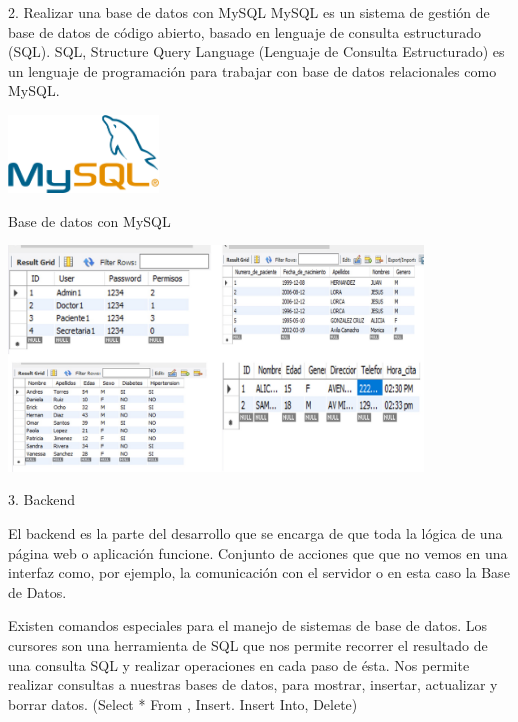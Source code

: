 \documentclass[10pt]{beamer}
\begin{document}
\begin{frame}{2. Realizar una base de datos con MySQL}
MySQL es un sistema de gestión de base de datos de código abierto, basado en lenguaje de consulta estructurado (SQL).
SQL, Structure Query Language (Lenguaje de Consulta Estructurado) es un lenguaje de programación para trabajar con base de datos relacionales como MySQL.

\centering
\includegraphics[width=4cm]{mysql.png}

\end{frame}
\begin{frame}{Base de datos con MySQL}

\centering
\includegraphics[width=11cm,]{junto.jpg}




\end{frame}



\begin{frame}{3. Backend}

El backend es la parte del desarrollo  que se encarga de que toda la lógica de una página web o aplicación  funcione. Conjunto de acciones que que no vemos en una interfaz como, por ejemplo, la comunicación con el servidor o en esta caso la Base de Datos.


Existen comandos especiales para el manejo de sistemas de base de datos. Los cursores son una herramienta de SQL que nos permite recorrer el resultado de una consulta SQL y realizar operaciones en cada paso de ésta.  Nos permite realizar consultas a nuestras bases de datos, para mostrar, insertar, actualizar y borrar datos. (Select * From , Insert. Insert Into, Delete) 


\end{frame}
\end{document}
